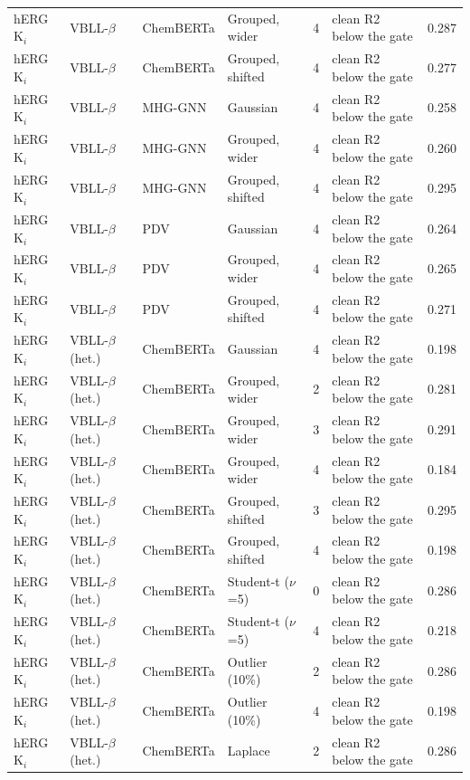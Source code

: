 {\begin{longtable}{llllcll}
hERG K$_i$ & VBLL-$\beta$ & ChemBERTa & Grouped, wider & 4 & clean R2 below the gate & 0.287 \\
hERG K$_i$ & VBLL-$\beta$ & ChemBERTa & Grouped, shifted & 4 & clean R2 below the gate & 0.277 \\
hERG K$_i$ & VBLL-$\beta$ & MHG-GNN & Gaussian & 4 & clean R2 below the gate & 0.258 \\
hERG K$_i$ & VBLL-$\beta$ & MHG-GNN & Grouped, wider & 4 & clean R2 below the gate & 0.260 \\
hERG K$_i$ & VBLL-$\beta$ & MHG-GNN & Grouped, shifted & 4 & clean R2 below the gate & 0.295 \\
hERG K$_i$ & VBLL-$\beta$ & PDV & Gaussian & 4 & clean R2 below the gate & 0.264 \\
hERG K$_i$ & VBLL-$\beta$ & PDV & Grouped, wider & 4 & clean R2 below the gate & 0.265 \\
hERG K$_i$ & VBLL-$\beta$ & PDV & Grouped, shifted & 4 & clean R2 below the gate & 0.271 \\
hERG K$_i$ & VBLL-$\beta$ (het.) & ChemBERTa & Gaussian & 4 & clean R2 below the gate & 0.198 \\
hERG K$_i$ & VBLL-$\beta$ (het.) & ChemBERTa & Grouped, wider & 2 & clean R2 below the gate & 0.281 \\
hERG K$_i$ & VBLL-$\beta$ (het.) & ChemBERTa & Grouped, wider & 3 & clean R2 below the gate & 0.291 \\
hERG K$_i$ & VBLL-$\beta$ (het.) & ChemBERTa & Grouped, wider & 4 & clean R2 below the gate & 0.184 \\
hERG K$_i$ & VBLL-$\beta$ (het.) & ChemBERTa & Grouped, shifted & 3 & clean R2 below the gate & 0.295 \\
hERG K$_i$ & VBLL-$\beta$ (het.) & ChemBERTa & Grouped, shifted & 4 & clean R2 below the gate & 0.198 \\
hERG K$_i$ & VBLL-$\beta$ (het.) & ChemBERTa & Student-t ($\nu$=5) & 0 & clean R2 below the gate & 0.286 \\
hERG K$_i$ & VBLL-$\beta$ (het.) & ChemBERTa & Student-t ($\nu$=5) & 4 & clean R2 below the gate & 0.218 \\
hERG K$_i$ & VBLL-$\beta$ (het.) & ChemBERTa & Outlier (10\%) & 2 & clean R2 below the gate & 0.286 \\
hERG K$_i$ & VBLL-$\beta$ (het.) & ChemBERTa & Outlier (10\%) & 4 & clean R2 below the gate & 0.198 \\
hERG K$_i$ & VBLL-$\beta$ (het.) & ChemBERTa & Laplace & 2 & clean R2 below the gate & 0.286 \\

\end{longtable}}
